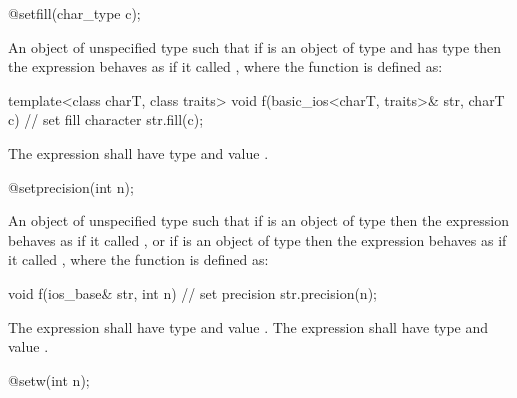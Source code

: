 %
\begin{itemdecl}
@\unspec@ setfill(char_type c);
\end{itemdecl}

\begin{itemdescr}
\pnum
\returns
An object of unspecified type such that if
is an object of type
and  has type
then the expression
behaves as if it called
, where the function  is defined as:

\begin{codeblock}
template<class charT, class traits>
void f(basic_ios<charT, traits>& str, charT c) {
  // set fill character
  str.fill(c);
}
\end{codeblock}

The expression
shall have type
and value
.
\end{itemdescr}

%
\begin{itemdecl}
@\unspec@ setprecision(int n);
\end{itemdecl}

\begin{itemdescr}
\pnum
\returns
An object of unspecified type such that if
is an object of type
then the expression
behaves as if it called
,
or if
is an object of type
then the expression
behaves as if it called
, where the function  is defined as:

\begin{codeblock}
void f(ios_base& str, int n) {
  // set precision
  str.precision(n);
}
\end{codeblock}

The expression
shall have type
and value
.
The expression
shall have type
and value
.
\end{itemdescr}

%
\begin{itemdecl}
@\unspec@ setw(int n);
\end{itemdecl}

